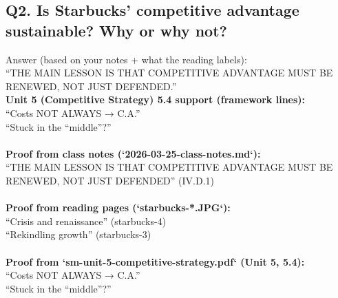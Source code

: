 \documentclass[10pt,a4paper]{article}
\begin{document}
\subsection*{\color{eublue}Q2. Is Starbucks' competitive advantage sustainable? Why or why not?}
Answer (based on your notes + what the reading labels):
\\
``THE MAIN LESSON IS THAT COMPETITIVE ADVANTAGE MUST BE RENEWED, NOT JUST DEFENDED.''
\\
\textbf{Unit 5 (Competitive Strategy) 5.4 support (framework lines):}
\\
``Costs NOT ALWAYS → C.A.''
\\
``Stuck in the “middle”?'' 
\\
\\
\textbf{Proof from class notes (`2026-03-25-class-notes.md`):}
\\
``THE MAIN LESSON IS THAT COMPETITIVE ADVANTAGE MUST BE RENEWED, NOT JUST DEFENDED'' (IV.D.1)
\\
\\
\textbf{Proof from reading pages (`starbucks-*.JPG`):}
\\
``Crisis and renaissance'' (starbucks-4)
\\
``Rekindling growth'' (starbucks-3)
\\
\\
\textbf{Proof from `sm-unit-5-competitive-strategy.pdf` (Unit 5, 5.4):}
\\
``Costs NOT ALWAYS → C.A.''
\\
``Stuck in the “middle”?'' 
\end{document}
